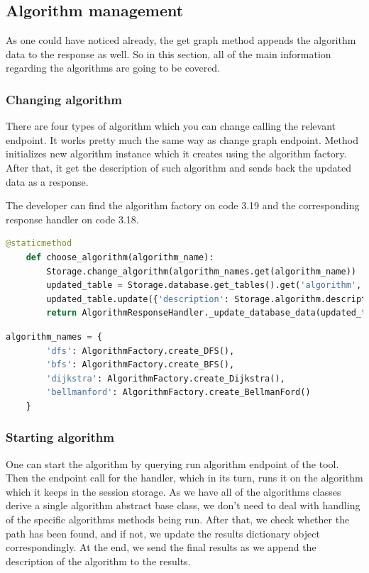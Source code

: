 \subsection{Algorithm management}

As one could have noticed already, the get graph method appends the algorithm data to the response as well. So in this section, all of the main information regarding the algorithms are going to be covered. 

\subsubsection{Changing algorithm}

There are four types of algorithm which you can change calling the relevant endpoint. It works pretty much the same way as change graph endpoint. Method initializes new algorithm instance which it creates using the algorithm factory. After that, it get the description of such algorithm and sends back the updated data as a response. 

The developer can find the algorithm factory on code 3.19 and the corresponding response handler on code 3.18.

\begin{lstlisting}[language={python}]
    @staticmethod
	def choose_algorithm(algorithm_name):
		Storage.change_algorithm(algorithm_names.get(algorithm_name))
		updated_table = Storage.database.get_tables().get('algorithm', {})
		updated_table.update({'description': Storage.algorithm.description()})
		return AlgorithmResponseHandler._update_database_data(updated_table)
\end{lstlisting}

\begin{lstlisting}[language={python}]
	algorithm_names = {
		'dfs': AlgorithmFactory.create_DFS(),
		'bfs': AlgorithmFactory.create_BFS(),
		'dijkstra': AlgorithmFactory.create_Dijkstra(),
		'bellmanford': AlgorithmFactory.create_BellmanFord()
	}
\end{lstlisting}

\subsubsection{Starting algorithm}

One can start the algorithm by querying run algorithm endpoint of the tool. Then the endpoint call for the handler, which in its turn, runs it on the algorithm which it keeps in the session storage. 
As we have all of the algorithms classes derive a single algorithm abstract base class, we don't need to deal with handling of the specific algorithms methods being run. After that, we check whether the path has been found, and if not, we update the results dictionary object correspondingly. At the end, we send the final results as we append the description of the algorithm to the results.

